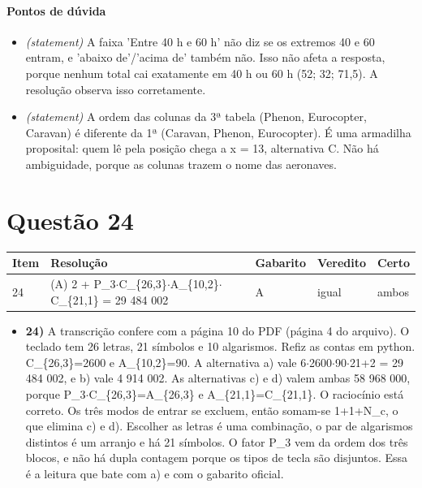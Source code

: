 \documentclass{article}%
\begin{document}
\paragraph{Pontos de dúvida}%
\begin{itemize}%
\item%
\textit{(statement)} A faixa 'Entre 40 h e 60 h' não diz se os extremos 40 e 60 entram, e 'abaixo de'/'acima de' também não. Isso não afeta a resposta, porque nenhum total cai exatamente em 40 h ou 60 h (52; 32; 71,5). A resolução observa isso corretamente.%
\item%
\textit{(statement)} A ordem das colunas da 3ª tabela (Phenon, Eurocopter, Caravan) é diferente da 1ª (Caravan, Phenon, Eurocopter). É uma armadilha proposital: quem lê pela posição chega a x = 13, alternativa C. Não há ambiguidade, porque as colunas trazem o nome das aeronaves.%
\end{itemize}%
\section*{Questão 24}%
\begin{longtable}{@{}p{} p{} p{} p{} p{}@{}}\toprule Item & Resolução & Gabarito & Veredito & Certo \\ \midrule
24 & (A) 2 + P\_3$\cdot$C\_\{26,3\}$\cdot$A\_\{10,2\}$\cdot$C\_\{21,1\} = 29 484 002 & A & igual & ambos \\
\bottomrule\end{longtable}%
\begin{itemize}%
\item%
\textbf{24)} A transcrição confere com a página 10 do PDF (página 4 do arquivo). O teclado tem 26 letras, 21 símbolos e 10 algarismos. Refiz as contas em python. C\_\{26,3\}=2600 e A\_\{10,2\}=90. A alternativa a) vale 6$\cdot$2600$\cdot$90$\cdot$21+2 = 29 484 002, e b) vale 4 914 002. As alternativas c) e d) valem ambas 58 968 000, porque P\_3$\cdot$C\_\{26,3\}=A\_\{26,3\} e A\_\{21,1\}=C\_\{21,1\}. O raciocínio está correto. Os três modos de entrar se excluem, então somam{-}se 1+1+N\_c, o que elimina c) e d). Escolher as letras é uma combinação, o par de algarismos distintos é um arranjo e há 21 símbolos. O fator P\_3 vem da ordem dos três blocos, e não há dupla contagem porque os tipos de tecla são disjuntos. Essa é a leitura que bate com a) e com o gabarito oficial.%
\end{itemize}%
\end{document}

